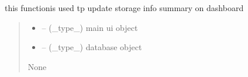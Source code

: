 \documentclass[letterpaper,10pt,english]{sphinxmanual}
\begin{document}
\begin{savenotes}\begin{fulllineitems}
\label{\detokenize{setting/backend/storage_funcs:oxin.backend.storage_funcs.show_storage_status}}
\pysigstartsignatures
{}
\pysigstopsignatures
\sphinxAtStartPar
this functionis used tp update storage info summary on dashboard
\begin{quote}\begin{description}
\begin{itemize}
\item {} 
\sphinxAtStartPar
{} – (\_type\_) main ui object

\item {} 
\sphinxAtStartPar
{} – (\_type\_) database object

\end{itemize}

\sphinxAtStartPar
None

\end{description}\end{quote}

\end{fulllineitems}\end{savenotes}

\end{document}
